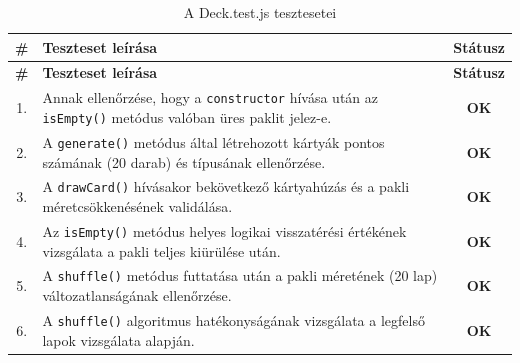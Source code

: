 \vspace{1em}
\begin{longtable}{| c | m{11.5cm} | c |}
    \caption{A Deck.test.js tesztesetei}
    \label{tab:test_deck} \\
    \hline
    \textbf{\#} & \textbf{Teszteset leírása} & \textbf{Státusz} \\
    \hline
    \endfirsthead
    \hline
    \textbf{\#} & \textbf{Teszteset leírása} & \textbf{Státusz} \\
    \hline
    \endhead
    \hline
    \endlastfoot

    1. & Annak ellenőrzése, hogy a \texttt{constructor} hívása után az \texttt{isEmpty()} metódus valóban üres paklit jelez-e. & \cellcolor{green!40}\textbf{OK} \\ \hline
    2. & A \texttt{generate()} metódus által létrehozott kártyák pontos számának (20 darab) és típusának ellenőrzése. & \cellcolor{green!40}\textbf{OK} \\ \hline
    3. & A \texttt{drawCard()} hívásakor bekövetkező kártyahúzás és a pakli méretcsökkenésének validálása. & \cellcolor{green!40}\textbf{OK} \\ \hline
    4. & Az \texttt{isEmpty()} metódus helyes logikai visszatérési értékének vizsgálata a pakli teljes kiürülése után. & \cellcolor{green!40}\textbf{OK} \\ \hline
    5. & A \texttt{shuffle()} metódus futtatása után a pakli méretének (20 lap) változatlanságának ellenőrzése. & \cellcolor{green!40}\textbf{OK} \\ \hline
    6. & A \texttt{shuffle()} algoritmus hatékonyságának vizsgálata a legfelső lapok vizsgálata alapján. & \cellcolor{green!40}\textbf{OK} \\ \hline
\end{longtable}

